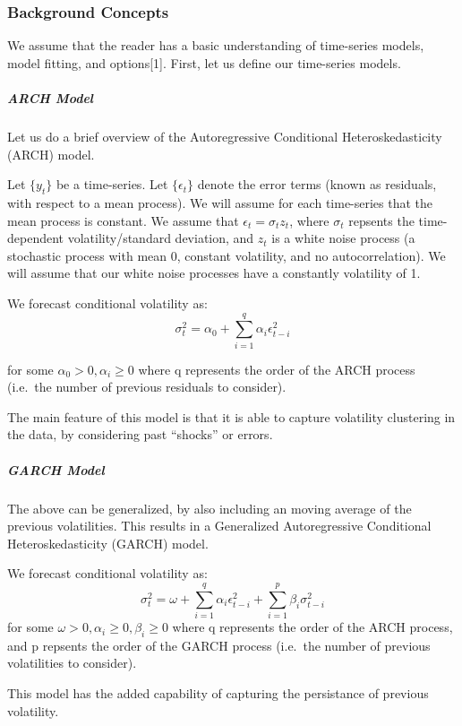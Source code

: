 \documentclass[11pt]{article}
\begin{document}
    \subsubsection{Background Concepts}\label{background-concepts}

    We assume that the reader has a basic understanding of time-series
models, model fitting, and options{[}1{]}. First, let us define our
time-series models.

\subparagraph{ARCH Model}\label{arch-model}

Let us do a brief overview of the Autoregressive Conditional
Heteroskedasticity (ARCH) model.

Let \(\{y_t\}\) be a time-series. Let \(\{\epsilon_t\}\) denote the
error terms (known as residuals, with respect to a mean process). We
will assume for each time-series that the mean process is constant. We
assume that \(\epsilon _t = \sigma_t z_t\), where \(\sigma_t\) repsents
the time-dependent volatility/standard deviation, and \(z_t\) is a white
noise process (a stochastic process with mean 0, constant volatility,
and no autocorrelation). We will assume that our white noise processes
have a constantly volatility of 1.

We forecast conditional volatility as:
\[\sigma^2_t = \alpha_0 + \sum_{i=1}^{q} {\alpha_i \epsilon^2_{t-i}}\]

for some \(\alpha_0 > 0, \alpha_i \geq 0\) where q represents the order
of the ARCH process (i.e.~the number of previous residuals to consider).

The main feature of this model is that it is able to capture volatility
clustering in the data, by considering past ``shocks'' or errors.

\subparagraph{GARCH Model}\label{garch-model}

The above can be generalized, by also including an moving average of the
previous volatilities. This results in a Generalized Autoregressive
Conditional Heteroskedasticity (GARCH) model.

We forecast conditional volatility as:
\[\sigma^2_t = \omega + \sum_{i=1}^{q} {\alpha_i \epsilon^2_{t-i}}+\sum_{i=1}^{p} {\beta_i \sigma^2_{t-i}} \]
for some \(\omega > 0, \alpha_i \geq 0, \beta_i \geq 0\) where q
represents the order of the ARCH process, and p repsents the order of
the GARCH process (i.e.~the number of previous volatilities to
consider).

This model has the added capability of capturing the persistance of
previous volatility.
\end{document}
